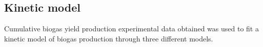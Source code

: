 \subsection{Kinetic model}
Cumulative biogas yield production experimental data obtained was used to fit a kinetic model of biogas production through three different models.